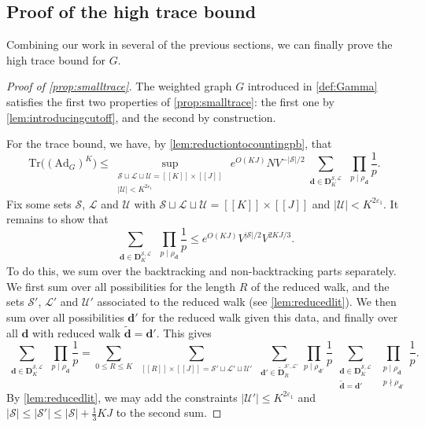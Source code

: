 \documentclass[11pt]{amsart}
\theoremstyle{definition}
\renewcommand{\leq}{\leqslant}
\newcommand{\sinterval}[1]{[\![#1]\!] }
\newcommand{\abs}[1]{\left|#1\right|}
\newcommand{\eps}{\varepsilon}
\newcommand{\Ad}{\mathrm{Ad}}
\newcommand{\Tr}{\mathrm{Tr}}
\renewcommand{\d}{\boldsymbol{d}}
\newcommand{\cstU}{2\eps_1}
\newcommand{\curlyL}{V}
\newcommand{\graph}{G}
\newcommand{\fprod}[1]{\rho_{#1}}
\newcommand{\pall}{\fprod{\d}}
\newcommand{\pallprime}{\fprod{\d'}}
\newcommand{\lit}{\mathcal{L}}
\newcommand{\unlit}{\mathcal{U}}
\newcommand{\s}{\mathcal{S}}
\newcommand{\fancyD}{\mathbf{D}}
\newcommand{\Dss}{\fancyD^{\s,\lit}_{\!\repK}}
\newcommand{\Dnbb}{\widetilde{\fancyD}^{\s',\lit'}_{\!\tupsize}}
\newcommand{\repR}{J}
\newcommand{\repK}{K}
\newcommand{\newK}{\sinterval{K}}
\newcommand{\newR}{\sinterval{J}}
\newcommand{\Redd}{\widetilde{\d}}
\newcommand{\newerKR}{\newK\times\newR}
\newcommand{\tupsize}{R}
\begin{document}
\subsection{Proof of the high trace bound}
\label{sec:proofofhightrace}
Combining our work in several of the previous sections, we can finally prove the high trace bound for $\graph$.
\begin{proof}[Proof of \cref{prop:smalltrace}]
The weighted graph $\graph$ introduced in \cref{def:Gamma} satisfies the first two properties of \cref{prop:smalltrace}: the first one by \cref{lem:introducingcutoff}, and the second by construction.

For the trace bound, we have, by \cref{lem:reductiontocountingpb}, that
\begin{equation*}
	\Tr \big((\Ad_{\graph})^{\repK}\big) \leq  \sup_{\substack{\s\sqcup \lit\sqcup \unlit = \newerKR\\ |\unlit| <\repK^{\cstU}}}\,e^{O(\repK \repR)} N \curlyL^{-|\s|/2}  \sum_{\substack{\d\in \Dss}}\,\prod_{p\mid \pall} \frac{1}{p}.
\end{equation*}
Fix some sets $\s$, $\lit$ and $\unlit$ with $\s\sqcup \lit\sqcup \unlit = \newerKR$ and $|\unlit| <\repK^{\cstU}$. It remains to show that
\begin{equation}
\label{eq:tracesectionten}
	  \sum_{\substack{\d\in \Dss}}\,\prod_{p\mid \pall} \frac{1}{p} \leq e^{O(\repK \repR)} \curlyL^{|\s|/2} \curlyL^{2\repK\repR/3}.
\end{equation}
To do this, we sum over the backtracking and non-backtracking parts separately. We first sum over all possibilities for the length $\tupsize$ of the reduced walk, and the sets $\s'$, $\lit'$ and $\unlit'$ associated to the reduced walk (see \cref{lem:reducedlit}). We then sum over all possibilities $\d'$ for the reduced walk given this data, and finally over all $\d$ with reduced walk $\Redd = \d'$. This gives
\begin{equation}
\label{eq:afterdividebnb}
 	\sum_{\substack{\d\in \Dss}}\,\prod_{p\mid \pall} \frac{1}{p} = \sum_{0\leq \tupsize\leq \repK}\, \sum_{\substack{\sinterval{\tupsize}\times \newR = \s'\sqcup \lit'\sqcup \unlit'}} \, \sum_{\d' \in \Dnbb} \, \prod_{p\mid \pallprime} \frac{1}{p}\, \sum_{\substack{\d \in \Dss\\ \Redd = \d'}}\, \prod_{\substack{p\mid \pall \\ p\nmid \pallprime}} \frac{1}{p}.
\end{equation}
By \cref{lem:reducedlit}, we may add the constraints $\abs{\unlit'}\leq \repK^{\cstU}$ and $|\s| \leq |\s'| \leq |\s| + \tfrac13 \repK \repR$ to the second sum. 


\end{proof}
\end{document}
